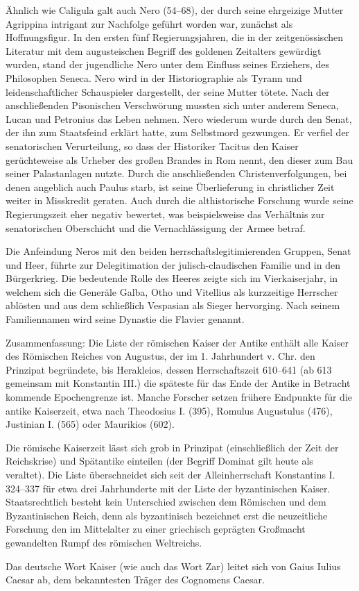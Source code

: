 Ähnlich wie Caligula galt auch Nero (54–68), der durch seine ehrgeizige Mutter Agrippina intrigant zur Nachfolge geführt worden war, zunächst als Hoffnungsfigur. In den ersten fünf Regierungsjahren, die in der zeitgenössischen Literatur mit dem augusteischen Begriff des goldenen Zeitalters gewürdigt wurden, stand der jugendliche Nero unter dem Einfluss seines Erziehers, des Philosophen Seneca. Nero wird in der Historiographie als Tyrann und leidenschaftlicher Schauspieler dargestellt, der seine Mutter tötete. Nach der anschließenden Pisonischen Verschwörung mussten sich unter anderem Seneca, Lucan und Petronius das Leben nehmen. Nero wiederum wurde durch den Senat, der ihn zum Staatsfeind erklärt hatte, zum Selbstmord gezwungen. Er verfiel der senatorischen Verurteilung, so dass der Historiker Tacitus den Kaiser gerüchteweise als Urheber des großen Brandes in Rom nennt, den dieser zum Bau seiner Palastanlagen nutzte. Durch die anschließenden Christenverfolgungen, bei denen angeblich auch Paulus starb, ist seine Überlieferung in christlicher Zeit weiter in Misskredit geraten. Auch durch die althistorische Forschung wurde seine Regierungszeit eher negativ bewertet, was beispielsweise das Verhältnis zur senatorischen Oberschicht und die Vernachlässigung der Armee betraf.

Die Anfeindung Neros mit den beiden herrschaftslegitimierenden Gruppen, Senat und Heer, führte zur Delegitimation der julisch-claudischen Familie und in den Bürgerkrieg. Die bedeutende Rolle des Heeres zeigte sich im Vierkaiserjahr, in welchem sich die Generäle Galba, Otho und Vitellius als kurzzeitige Herrscher ablösten und aus dem schließlich Vespasian als Sieger hervorging. Nach seinem Familiennamen wird seine Dynastie die Flavier genannt.

Zusammenfassung:
Die Liste der römischen Kaiser der Antike enthält alle Kaiser des Römischen Reiches von Augustus, der im 1. Jahrhundert v. Chr. den Prinzipat begründete, bis Herakleios, dessen Herrschaftszeit 610–641 (ab 613 gemeinsam mit Konstantin III.) die späteste für das Ende der Antike in Betracht kommende Epochengrenze ist. Manche Forscher setzen frühere Endpunkte für die antike Kaiserzeit, etwa nach Theodosius I. (395), Romulus Augustulus (476), Justinian I. (565) oder Maurikios (602).

Die römische Kaiserzeit lässt sich grob in Prinzipat (einschließlich der Zeit der Reichskrise) und Spätantike einteilen (der Begriff Dominat gilt heute als veraltet). Die Liste überschneidet sich seit der Alleinherrschaft Konstantins I. 324–337 für etwa drei Jahrhunderte mit der Liste der byzantinischen Kaiser. Staatsrechtlich besteht kein Unterschied zwischen dem Römischen und dem Byzantinischen Reich, denn als byzantinisch bezeichnet erst die neuzeitliche Forschung den im Mittelalter zu einer griechisch geprägten Großmacht gewandelten Rumpf des römischen Weltreichs.

Das deutsche Wort Kaiser (wie auch das Wort Zar) leitet sich von Gaius Iulius Caesar ab, dem bekanntesten Träger des Cognomens Caesar.




